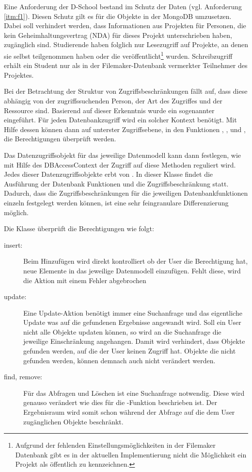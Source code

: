 Eine Anforderung der D-School bestand im Schutz der Daten (vgl. Anforderung \ref{itm:f1}). Diesen Schutz gilt es für die Objekte in der MongoDB umzusetzen. Dabei soll verhindert werden, dass Informationen aus Projekten für Personen, die kein Geheimhaltungsvertrag (NDA) für dieses Projekt unterschrieben haben, zugänglich sind. Studierende haben folglich nur Lesezugriff auf Projekte, an denen sie selbst teilgenommen haben oder die veröffentlicht\footnote{Aufgrund der fehlenden Einstellungsmöglichkeiten in der Filemaker Datenbank gibt es in der aktuellen Implementierung nicht die Möglichkeit ein Projekt als öffentlich zu kennzeichnen.} wurden. Schreibzugriff erhält ein Student nur als in der Filemaker-Datenbank vermerkter Teilnehmer des Projektes.

Bei der Betrachtung der Struktur von Zugriffsbeschränkungen fällt auf, dass diese abhängig von der zugriffssuchenden Person, der Art des Zugriffes und der Ressource sind. Basierend auf dieser Erkenntnis wurde ein sogenannter  eingeführt. Für jeden Datenbankzugriff wird ein solcher Kontext benötigt. Mit Hilfe dessen können dann auf unterster Zugriffsebene, in den Funktionen , ,  und , die Berechtigungen überprüft werden.

Das Datenzugriffsobjekt für das jeweilige Datenmodell kann dann festlegen, wie mit Hilfe des DBAccessContext der Zugriff auf diese Methoden reguliert wird. Jedes dieser Datenzugriffsobjekte erbt von . In dieser Klasse findet die Ausführung der Datenbank Funktionen und die Zugriffsbeschränkung statt. Dadurch, dass die Zugriffsbeschränkungen für die jeweiligen Datenbankfunktionen einzeln festgelegt werden können, ist eine sehr feingranulare Differenzierung möglich.

Die Klasse  überprüft die Berechtigungen wie folgt:
\begin{description}
\item[insert:] Beim Hinzufügen wird direkt kontrolliert ob der User die Berechtigung hat, neue Elemente in das jeweilige Datenmodell einzufügen. Fehlt diese, wird die Aktion mit einem Fehler abgebrochen
\item[update:] Eine Update-Aktion benötigt immer eine Suchanfrage und das eigentliche Update was auf die gefundenen Ergebnisse angewandt wird. Soll ein User nicht alle Objekte updaten können, so wird an die Suchanfrage die jeweilige Einschränkung angehangen. Damit wird verhindert, dass Objekte gefunden werden, auf die der User keinen Zugriff hat. Objekte die nicht gefunden werden, können demnach auch nicht verändert werden.
\item[find, remove:] Für das Abfragen und Löschen ist eine Suchanfrage notwendig. Diese wird genauso verändert wie dies für die -Funktion beschrieben ist. Der Ergebnisraum wird somit schon während der Abfrage auf die dem User zugänglichen Objekte beschränkt.
\end{description}

